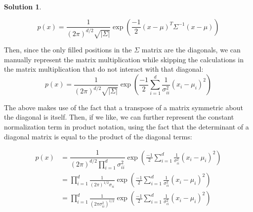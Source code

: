 \documentclass{article}
\theoremstyle{definition}
\newtheorem*{solution}{Solution}
\begin{document}
\begin{solution}
\begin{enumerate}[1.]
\begin{enumerate}[(a)]
                	\begin{equation*}
                    	p(x) = \dfrac{1}{(2\pi)^{d/2} \sqrt{|\Sigma|}} \exp(\frac{-1}{2}(x-\mu)^{T}\Sigma^{-1}(x-\mu))
                    \end{equation*}
                    
                Then, since the only filled positions in the $\Sigma$ matrix are the diagonals, we can manually represent the matrix multiplication while skipping the calculations in the matrix multiplication that do not interact with that diagonal:
                	\begin{equation*}
                		p(x) = \dfrac{1}{(2\pi)^{d/2} \sqrt{|\Sigma|}} \exp( \frac{-1}{2} \sum_{i=1}^{d} \frac{1}{\sigma_{ii}^{2}} (x_{i} - \mu_{i})^{2} )
                	\end{equation*}
                
                The above makes use of the fact that a transpose of a matrix symmetric about the diagonal is itself. Then, if we like, we can further represent the constant normalization term in product notation, using the fact that the determinant of a diagonal matrix is equal to the product of the diagonal terms:
                
                \begin{equation*}
                	\begin{split}
                    	p(x) & = \dfrac{1}{(2\pi)^{d/2} \prod_{i=1}^{d} \sigma^{2}_{ii}} \exp( \frac{-1}{2} \sum_{i=1}^{d} \frac{1}{\sigma_{ii}^{2}} (x_{i} - \mu_{i})^{2} ) \\
                        & = \prod_{i=1}^{d} \frac{1}{(2\pi)^{1/2} \sigma_{ii} } \exp( \frac{-1}{2} \sum_{i=1}^{d} \frac{1}{\sigma_{ii}^{2}} (x_{i} - \mu_{i})^{2} ) \\
                        & = \prod_{i=1}^{d} \frac{1}{(2\pi \sigma_{ii}^2)^{1/2} } \exp( \frac{-1}{2} \sum_{i=1}^{d} \frac{1}{\sigma_{ii}^{2}} (x_{i} - \mu_{i})^{2} )
                    \end{split}
                \end{equation*}
                
                    

\end{enumerate}
\end{enumerate}
\end{solution}
\end{document}
